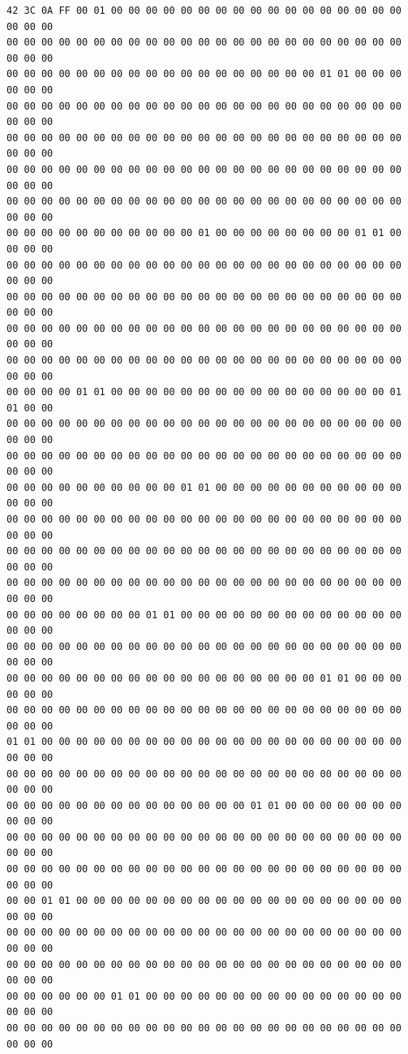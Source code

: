 \documentclass[a4paper]{article}
\begin{document}
\begin{verbatim}
42 3C 0A FF 00 01 00 00 00 00 00 00 00 00 00 00 00 00 00 00 00 00 00 00 00 00
00 00 00 00 00 00 00 00 00 00 00 00 00 00 00 00 00 00 00 00 00 00 00 00 00 00
00 00 00 00 00 00 00 00 00 00 00 00 00 00 00 00 00 00 01 01 00 00 00 00 00 00
00 00 00 00 00 00 00 00 00 00 00 00 00 00 00 00 00 00 00 00 00 00 00 00 00 00
00 00 00 00 00 00 00 00 00 00 00 00 00 00 00 00 00 00 00 00 00 00 00 00 00 00
00 00 00 00 00 00 00 00 00 00 00 00 00 00 00 00 00 00 00 00 00 00 00 00 00 00
00 00 00 00 00 00 00 00 00 00 00 00 00 00 00 00 00 00 00 00 00 00 00 00 00 00
00 00 00 00 00 00 00 00 00 00 00 01 00 00 00 00 00 00 00 00 01 01 00 00 00 00
00 00 00 00 00 00 00 00 00 00 00 00 00 00 00 00 00 00 00 00 00 00 00 00 00 00
00 00 00 00 00 00 00 00 00 00 00 00 00 00 00 00 00 00 00 00 00 00 00 00 00 00
00 00 00 00 00 00 00 00 00 00 00 00 00 00 00 00 00 00 00 00 00 00 00 00 00 00
00 00 00 00 00 00 00 00 00 00 00 00 00 00 00 00 00 00 00 00 00 00 00 00 00 00
00 00 00 00 01 01 00 00 00 00 00 00 00 00 00 00 00 00 00 00 00 00 01 01 00 00
00 00 00 00 00 00 00 00 00 00 00 00 00 00 00 00 00 00 00 00 00 00 00 00 00 00
00 00 00 00 00 00 00 00 00 00 00 00 00 00 00 00 00 00 00 00 00 00 00 00 00 00
00 00 00 00 00 00 00 00 00 00 01 01 00 00 00 00 00 00 00 00 00 00 00 00 00 00
00 00 00 00 00 00 00 00 00 00 00 00 00 00 00 00 00 00 00 00 00 00 00 00 00 00
00 00 00 00 00 00 00 00 00 00 00 00 00 00 00 00 00 00 00 00 00 00 00 00 00 00
00 00 00 00 00 00 00 00 00 00 00 00 00 00 00 00 00 00 00 00 00 00 00 00 00 00
00 00 00 00 00 00 00 00 01 01 00 00 00 00 00 00 00 00 00 00 00 00 00 00 00 00
00 00 00 00 00 00 00 00 00 00 00 00 00 00 00 00 00 00 00 00 00 00 00 00 00 00
00 00 00 00 00 00 00 00 00 00 00 00 00 00 00 00 00 00 01 01 00 00 00 00 00 00
00 00 00 00 00 00 00 00 00 00 00 00 00 00 00 00 00 00 00 00 00 00 00 00 00 00
01 01 00 00 00 00 00 00 00 00 00 00 00 00 00 00 00 00 00 00 00 00 00 00 00 00
00 00 00 00 00 00 00 00 00 00 00 00 00 00 00 00 00 00 00 00 00 00 00 00 00 00
00 00 00 00 00 00 00 00 00 00 00 00 00 00 01 01 00 00 00 00 00 00 00 00 00 00
00 00 00 00 00 00 00 00 00 00 00 00 00 00 00 00 00 00 00 00 00 00 00 00 00 00
00 00 00 00 00 00 00 00 00 00 00 00 00 00 00 00 00 00 00 00 00 00 00 00 00 00
00 00 01 01 00 00 00 00 00 00 00 00 00 00 00 00 00 00 00 00 00 00 00 00 00 00
00 00 00 00 00 00 00 00 00 00 00 00 00 00 00 00 00 00 00 00 00 00 00 00 00 00
00 00 00 00 00 00 00 00 00 00 00 00 00 00 00 00 00 00 00 00 00 00 00 00 00 00
00 00 00 00 00 00 01 01 00 00 00 00 00 00 00 00 00 00 00 00 00 00 00 00 00 00
00 00 00 00 00 00 00 00 00 00 00 00 00 00 00 00 00 00 00 00 00 00 00 00 00 00

\end{verbatim}
\end{document}
